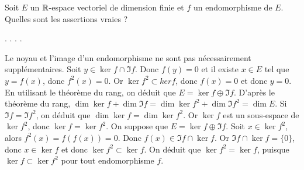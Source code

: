 \begin{question}
Soit $E$ un $\mathbb{R}$-espace vectoriel de dimension finie et $f$ un endomorphisme de $E$. Quelles sont les assertions vraies ?
\begin{answers}  
.
.
.
.
\end{answers}
\begin{explanations} Le noyau et l'image d'un endomorphisme ne sont pas nécessairement supplémentaires.
\vskip0mm
Soit $y\in \ker f \cap \Im f$. Donc $f(y)=0$ et il existe $x\in E$ tel que $y=f(x)$, donc  $f^2(x)=0$. Or $\ker f^2 \subset ker f$, donc $f(x)=0$ et donc $y=0$. En utilisant le théorème du rang, on déduit que $E= \ker f \oplus \Im f $.
\vskip0mm
D'après le théorème du rang, $\dim \ker f+ \dim \Im f = \dim \ker f^2+ \dim \Im f^2=\dim E$. Si  $\Im f= \Im f^2$, 
on déduit que $\dim \ker f= \dim \ker f^2$. Or $\ker f$ est un sous-espace de $\ker f^2$, donc $\ker f= \ker f^2$.
\vskip0mm
On suppose que $E= \ker f \oplus \Im f $. Soit $x\in \ker f^2$, alors $f^2(x)=f(f(x))=0$. Donc $f(x) \in \Im f \cap \ker f$. Or $\Im f \cap \ker f = \{0\}$, donc $x\in \ker f$ et donc $\ker f^2 \subset \ker f$. On déduit que $\ker f^2 = \ker f$, puisque $\ker f \subset \ker f^2$ pour tout endomorphisme $f$.
\end{explanations}
\end{question}
